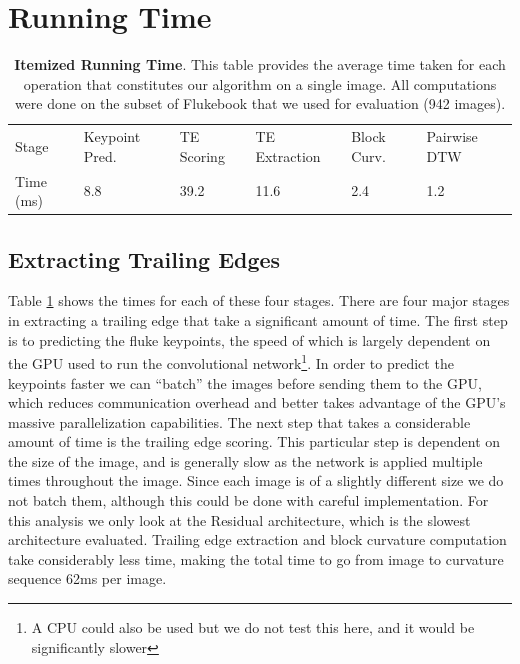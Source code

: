 \section{Running Time}


\begin{table}[t]%
	\caption{\textbf{Itemized Running Time}. This table provides the average time taken for each operation that constitutes our algorithm on a single image. All computations were done on the subset of Flukebook that we used for evaluation (942 images).}
	\centering
	\resizebox{\linewidth}{!}
	{
		\begin{tabular} {| l || l | l | l | l || l |}
		\hline
		Stage & Keypoint Pred. & TE Scoring & TE Extraction & Block Curv. & Pairwise DTW \\
		\hhline{|=#===#==|}
		Time (ms) & 8.8 & 39.2 & 11.6 & 2.4 & 1.2 \\
		\hline
		\end{tabular}
	}
	\label{tab:extract_te_times}
\end{table}




\subsection{Extracting Trailing Edges}

Table \ref{tab:extract_te_times} shows the times for each of these four stages.
There are four major stages in extracting a trailing edge that take a significant amount of time.
The first step is to predicting the fluke keypoints, the speed of which is largely dependent on the GPU used to run the convolutional network\footnote{A CPU could also be used but we do not test this here, and it would be significantly slower}.
In order to predict the keypoints faster we can ``batch'' the images before sending them to the GPU, which reduces communication overhead and better takes advantage of the GPU's massive parallelization capabilities.
The next step that takes a considerable amount of time is the trailing edge scoring.
This particular step is dependent on the size of the image, and is generally slow as the network is applied multiple times throughout the image.
Since each image is of a slightly different size we do not batch them, although this could be done with careful implementation.
For this analysis we only look at the Residual architecture, which is the slowest architecture evaluated.
Trailing edge extraction and block curvature computation take considerably less time, making the total time to go from image to curvature sequence 62ms per image.

